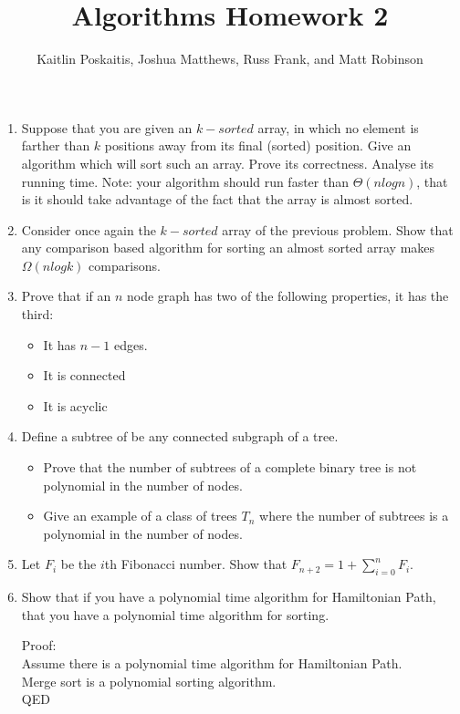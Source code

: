 \documentclass[12pt]{article}
\title{\bf Algorithms Homework 2}
\author{Kaitlin Poskaitis, Joshua Matthews, Russ Frank, and Matt Robinson}
\date{}
\begin{document}
\maketitle

\begin{enumerate}
\item Suppose that you are given an $k-sorted$ array, in which no element is
    farther than $k$ positions away from its final (sorted) position. Give an
    algorithm which will sort such an array. Prove its correctness. Analyse its
    running time. Note: your algorithm should run faster than $\Theta(nlogn)$,
    that is it should take advantage of the fact that the array is almost
    sorted.


\item Consider once again the $k-sorted$ array of the previous problem. Show
    that any comparison based algorithm for sorting an almost sorted array makes
    $\Omega(nlogk)$ comparisons.

\item Prove that if an $n$ node graph has two of the following properties, it has the
third:
\begin{itemize}
    \item It has $n-1$ edges.
    \item It is connected
    \item It is acyclic
\end{itemize}

\item Define a subtree of be any connected subgraph of a tree.
    \begin{itemize}
        \item Prove that the number of subtrees of a complete binary tree is not
            polynomial in the number of nodes.
        \item Give an example of a class of trees ${T_n}$ where the number of
            subtrees is a polynomial in the number of nodes.
    \end{itemize}

\item Let $F_i$ be the $i$th Fibonacci number. Show that $F_{n+2} = 1 +
    \sum_{i=0}^n F_i$.

\item Show that if you have a polynomial time algorithm for Hamiltonian Path,
    that you have a polynomial time algorithm for sorting.

    Proof:\\
    Assume there is a polynomial time algorithm for Hamiltonian Path.\\
    Merge sort is a polynomial sorting algorithm.\\
    QED


\end{enumerate}
\end{document}
